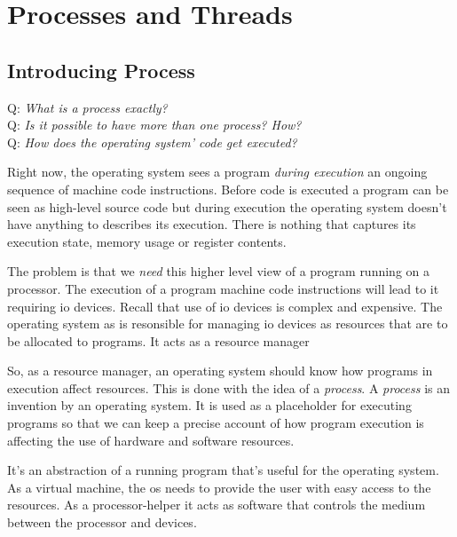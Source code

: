 
\chapter{Processes and Threads}





\section{Introducing Process}

Q: \textit{What is a process exactly?} \\
Q: \textit{Is it possible to have more than one process? How?}  \\
Q: \textit{How does the operating system' code get executed?}

Right now, the operating system sees a program \textit{during execution} 
an ongoing sequence of machine code instructions. Before code is executed 
a program can be seen as high-level source code but during 
execution the operating system doesn't have anything to describes its execution. 
There is nothing that captures its execution state, memory usage or register contents. 

The problem is that we \textit{need} this higher level view of a program running on a processor.
The execution of a program machine code instructions will lead to it requiring io devices.
Recall that use of io devices is complex and expensive. 
The operating system as is resonsible for managing io devices as resources that 
are to be allocated to programs. It acts as a resource manager

So, as a resource manager, an operating system should know how programs in 
execution affect resources. This is done with the idea of a \textit{process}. 
A \textit{process} is an invention by an operating system. 
It is used as a placeholder for executing programs so that we can keep a precise 
account of how program execution is affecting the use of hardware and software resources.


It's an abstraction of a running program that's useful for the operating system.
As a virtual machine, the os needs to provide the user with easy access to the 
resources. As a processor-helper it acts as software that controls the
medium between the processor and devices.


